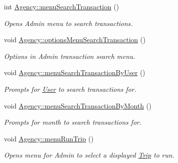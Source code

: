\begin{DoxyCompactItemize}
\mbox{\label{group___agency_ga8190f01535be829647cdb79e65bd6dbc}} 
int \hyperlink{group___agency_ga8190f01535be829647cdb79e65bd6dbc}{Agency\+::menu\+Search\+Transaction} ()
\begin{DoxyCompactList}\small\item\em Opens Admin menu to search transactions. \end{DoxyCompactList}\item 
\mbox{\label{group___agency_ga766926448390b8388cd1633c5c221318}} 
void \hyperlink{group___agency_ga766926448390b8388cd1633c5c221318}{Agency\+::options\+Menu\+Search\+Transaction} ()
\begin{DoxyCompactList}\small\item\em Options in Admin transaction search menu. \end{DoxyCompactList}\item 
\mbox{\label{group___agency_ga24e634ecf44a266d90758022ae516032}} 
void \hyperlink{group___agency_ga24e634ecf44a266d90758022ae516032}{Agency\+::menu\+Search\+Transaction\+By\+User} ()
\begin{DoxyCompactList}\small\item\em Prompts for \hyperlink{class_user}{User} to search transactions for. \end{DoxyCompactList}\item 
\mbox{\label{group___agency_gaba8bea8c53bffa9e4eef2289267907bd}} 
void \hyperlink{group___agency_gaba8bea8c53bffa9e4eef2289267907bd}{Agency\+::menu\+Search\+Transaction\+By\+Month} ()
\begin{DoxyCompactList}\small\item\em Prompts for month to search transactions for. \end{DoxyCompactList}\item 
\mbox{\label{group___agency_ga4e0dc0a2296c122cf7769600abc06223}} 
void \hyperlink{group___agency_ga4e0dc0a2296c122cf7769600abc06223}{Agency\+::menu\+Run\+Trip} ()
\begin{DoxyCompactList}\small\item\em Opens menu for Admin to select a displayed \hyperlink{class_trip}{Trip} to run. \end{DoxyCompactList}\end{DoxyCompactItemize}
